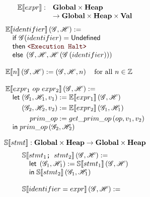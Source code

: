\begin{figure}

\begin{minipage}{.46\textwidth}
\[\begin{array}{rl}
  \mathbb{E}\!\left\llbracket expr \right\rrbracket :& \mathbf{Global} \times \mathbf{Heap} \\
  &\to \mathbf{Global} \times \mathbf{Heap} \times \mathbf{Val} \\
\end{array}\]
\[
  \begin{array}{l}
    \Ctx{E}{identifier}\left(\Glo, \Hea\right) := \\
    \quad \ifm \Glo(identifier) = \undefm \\
    \quad \thenm \Halt \\
    \quad \elsem \left(\Glo, \Hea, \Hea\left(\Glo\left(identifier\right)\right)\right) \\
    \\
    \Ctx{E}{n}\left(\Glo, \Hea\right) := \left(\Glo, \Hea, n\right) \quad \text{for all } n \in \mathbb{Z}\\
    \\
    \Ctx{E}{expr_1~op~expr_2}\left(\Glo, \Hea\right) := \\
    \quad \letm
    \begin{aligned}[t]
       \left(\Glo_1, \Hea_1, v_1\right) &:= \Ctx{E}{expr_1}\left(\Glo, \Hea\right) \\
       \left(\Glo_2, \Hea_2, v_2\right) &:= \Ctx{E}{expr_2}\left(\Glo_1, \Hea_1\right) \\
       prim\_op &:= get\_prim\_op\left(op, v_1, v_2\right) \\
    \end{aligned} \\
    \quad \inm prim\_op\left(\Glo_2, \Hea_2\right)
  \end{array}
\]
\end{minipage}%
\hfill%
\begin{minipage}{.46\textwidth}
\[\mathbb{S}\!\left\llbracket stmt \right\rrbracket : \mathbf{Global} \times \mathbf{Heap} \to \mathbf{Global} \times \mathbf{Heap}\]
\[
  \begin{array}{l}
    \mathbb{S}\!\left\llbracket stmt_1\texttt{; } stmt_2 \right\rrbracket\left(\mathscr{G}, \mathscr{H}\right) := \\
    \quad \mathsf{let}\; \left(\mathscr{G}_1, \mathscr{H}_1\right) := \mathbb{S}\!\left\llbracket stmt_1 \right\rrbracket\left(\mathscr{G}, \mathscr{H}\right) \\
    \quad \mathsf{in}\; \mathbb{S}\!\left\llbracket stmt_2 \right\rrbracket\left(\mathscr{G}_1, \mathscr{H}_1\right) \\
    \\
    \mathbb{S}\!\left\llbracket identifier = expr \right\rrbracket\left(\mathscr{G}, \mathscr{H}\right) := \\

\end{array}\]
\end{minipage}
\end{figure}
